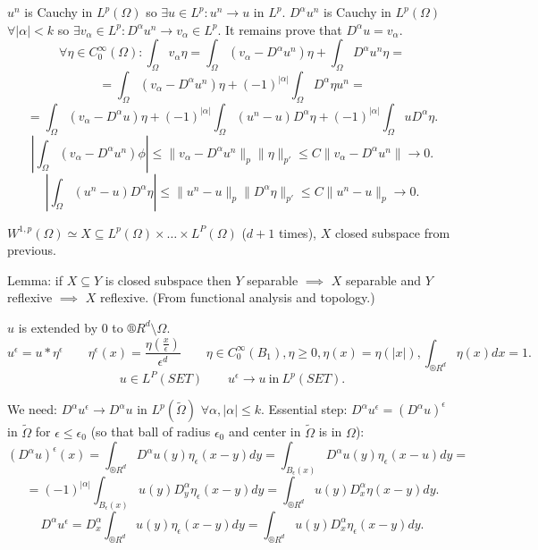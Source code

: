 \documentclass[12pt]{article}					%
\begin{document}
\break

\begin{dukaz}
	$u^n$ is Cauchy in $L^p(\Omega)$ so $\exists u \in L^p: u^n \rightarrow u$ in $L^p$. $D^\alpha u^n$ is Cauchy in $L^p(\Omega)$ $\forall |\alpha| < k$ so $\exists v_\alpha \in L^p: D^\alpha u^n \rightarrow v_\alpha \in L^p$. It remains prove that $D^\alpha u = v_\alpha$.
	$$ \forall \eta \in C_0^∞(\Omega): \int_\Omega v_\alpha \eta = \int_\Omega (v_\alpha - D^\alpha u^n)\eta + \int_\Omega D^{\alpha}u^n\eta = $$
	$$ = \int_\Omega(v_\alpha - D^\alpha u^n) \eta + (-1)^{|\alpha|} \int_\Omega D^\alpha \eta u^n = $$
	$$ = \int_\Omega(v_\alpha - D^\alpha u) \eta + (-1)^{|\alpha|} \int_\Omega(u^n - u)D^\alpha\eta + (-1)^{|\alpha|}\int_\Omega u D^\alpha \eta. $$
	$$ \left|\int_\Omega (v_\alpha - D^\alpha u^n) \phi\right| ≤ \|v_\alpha - D^\alpha u^n\|_p \|\eta\|_{p'} ≤ C \|v_\alpha - D^\alpha u^n\| \rightarrow 0. $$
	$$ \left|\int_\Omega (u^n - u) D^\alpha \eta\right| ≤ \|u^n - u\|_p \|D^\alpha \eta\|_{p'} ≤ C \|u^n - u\|_p \rightarrow 0. $$
\end{dukaz}

\begin{dukaz}
	$W^{1, p}(\Omega) \simeq X \subseteq L^p(\Omega) \times … \times L^P(\Omega)$ ($d+1$ times), $X$ closed subspace from previous.

	Lemma: if $X \subseteq Y$ is closed subspace then $Y$ separable $\implies$ $X$ separable and $Y$ reflexive $\implies$ $X$ reflexive. (From functional analysis and topology.)
\end{dukaz}

\begin{dukaz}
	$u$ is extended by 0 to $®R^d \setminus \Omega$.
	$$ u^\epsilon = u * \eta^\epsilon \qquad \eta^\epsilon(x) = \frac{\eta(\frac{x}{\epsilon})}{\epsilon^d} \qquad \eta \in C_0^∞(B_1), \eta ≥ 0, \eta(x) = \eta(|x|), \int_{®R^d}\eta(x) dx = 1. $$
	$$ u \in L^P(SET) \qquad u^\epsilon \rightarrow u\ \text{in}\ L^p(SET). $$

	We need: $D^\alpha u^\epsilon \rightarrow D^\alpha u$ in $L^p(\tilde\Omega)$ $\forall \alpha, |\alpha| ≤ k$. Essential step: $D^\alpha u^\epsilon = (D^\alpha u)^\epsilon$ in $\tilde\Omega$ for $\epsilon ≤ \epsilon_0$ (so that ball of radius $\epsilon_0$ and center in $\tilde\Omega$ is in $\Omega$):
	$$ (D^\alpha u)^\epsilon(x) = \int_{®R^d} D^\alpha u(y) \eta_\epsilon(x-y) dy = \int_{B_\epsilon(x)} D^\alpha u(y) \eta_\epsilon(x - u) dy = $$
	$$ = (-1)^{|\alpha|} \int_{B_\epsilon(x)} u(y) D^\alpha_y \eta_\epsilon(x - y) dy = \int_{®R^d} u(y) D_x^\alpha \eta(x - y) dy. $$
	$$ D^\alpha u^\epsilon = D_x^\alpha \int_{®R^d} u(y) \eta_\epsilon(x - y) dy = \int_{®R^d} u(y) D_x^\alpha \eta_\epsilon(x - y) dy. $$
\end{dukaz}
\end{document}
